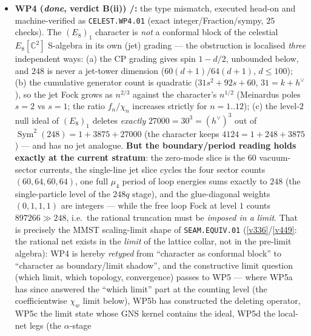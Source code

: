 \documentclass[11pt,a4paper]{article}
\newcommand{\cthree}{c_3}
\newcommand{\gcar}{g_{\mathrm{car}}}
\begin{document}
\begin{itemize}
$\gcar{=}5\mid h^\vee$ ($1/8$); the conjunction that isolates $\mathfrak e_8$ is post hoc, not
preregistered. \emph{Alignment survives; selectivity does not} --- the $\cthree$-connection of the
celestial route is convention-level compatibility plus genuine $\lambda$-arithmetic, \emph{not}
$\mathfrak e_8$-selective evidence, and never a derivation of $\cthree$ from celestial data.
\item \textbf{WP4 (\emph{done}, verdict B(ii)) \mE/\mC:} the type mismatch, executed head-on and
machine-verified as \texttt{CELEST.WP4.01}  (exact
integer/Fraction/sympy, $25$ checks). The $(E_8)_1$ character is \emph{not} a conformal block of the
celestial $E_8[\mathbb C^2]$ S-algebra in its own (jet) grading --- the obstruction is localised
\emph{three} independent ways: (a) the CP grading gives spin $1-d/2$, unbounded below, and $248$ is never
a jet-tower dimension ($60(d{+}1)/64(d{+}1)$, $d\le100$); (b) the cumulative generator count is quadratic
($31s^2{+}92s{+}60$, $31=k{+}h^\vee$), so the jet Fock grows as $n^{2/3}$ against the character's
$n^{1/2}$ (Meinardus poles $s{=}2$ vs $s{=}1$; the ratio $f_n/\chi_n$ increases strictly for $n=1..12$);
(c) the level-$2$ null ideal of $(E_8)_1$ deletes \emph{exactly}
$27000=30^3=(h^\vee)^3$ out of $\operatorname{Sym}^2(248)=1{+}3875{+}27000$ (the character keeps
$4124=1{+}248{+}3875$) --- and has no jet analogue. \textbf{But the boundary/period reading holds exactly
at the current stratum}: the zero-mode slice is the $60$ vacuum-sector currents, the single-line jet slice
cycles the four sector counts $(60,64,60,64)$, one full $\mu_4$ period of loop energies sums exactly to
$248$ (the single-particle level of the $248q$ stage), and the glue-diagonal weights $(0,1,1,1)$ are
integers --- while the free loop Fock at level $1$ counts $897266\gg248$, i.e.\ the rational truncation
must be \emph{imposed in a limit}. That is precisely the MMST scaling-limit shape of
\texttt{SEAM.EQUIV.01} (\vref{v336}/\vref{v449}: the rational net exists in the \emph{limit} of the
lattice collar, not in the pre-limit algebra): WP4 is hereby \emph{retyped} from ``character as conformal
block'' to ``character as boundary/limit shadow'', and the constructive limit question (which limit, which
topology, convergence) passes to WP5 --- where WP5a has since answered the ``which limit'' part at the
counting level (the coefficientwise $\chi_w$ limit below), WP5b has constructed the deleting operator,
WP5c the limit state whose GNS kernel contains the ideal, WP5d the local-net legs (the $\alpha$-stage

\end{itemize}
\end{document}
